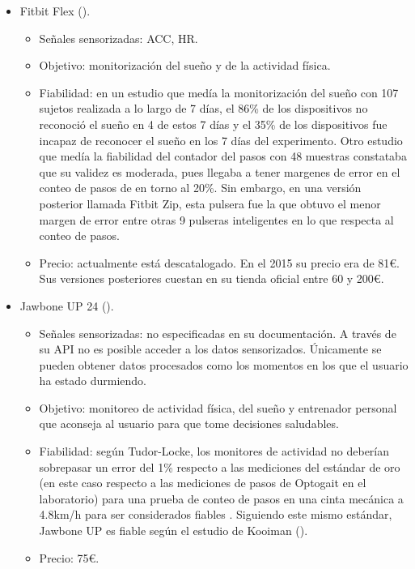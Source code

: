 \begin{itemize}
    \item Fitbit Flex (\citeyear{martinez2015wristband}).
    \begin{itemize}
        \item Señales sensorizadas: ACC, HR.
        \item Objetivo: monitorización del sueño y de la actividad física.
        \item Fiabilidad: en un estudio que medía la monitorización del sueño con 107 sujetos realizada a lo largo de 7 días, el 86\% de los dispositivos no reconoció el sueño en 4 de estos 7 días y el 35\% de los dispositivos fue incapaz de reconocer el sueño en los 7 días del experimento\citep{baroni2015fitbit}. Otro estudio que medía la fiabilidad del contador del pasos con 48 muestras constataba que su validez es moderada, pues llegaba a tener margenes de error en el conteo de pasos de en torno al 20\%\citep{sushames2016validity}. Sin embargo, en una versión posterior llamada Fitbit Zip, esta pulsera fue la que obtuvo el menor margen de error entre otras 9 pulseras inteligentes en lo que respecta al conteo de pasos\citep{kooiman2015reliability}.
        \item Precio: actualmente está descatalogado. En el 2015 su precio era de 81€. Sus versiones posteriores cuestan en su tienda oficial entre 60 y 200€.
    \end{itemize}

    \item Jawbone UP 24 (\citeyear{jawbone24}).
    \begin{itemize}
        \item Señales sensorizadas: no especificadas en su documentación. A través de su API no es posible acceder a los datos sensorizados. Únicamente se pueden obtener datos procesados como los momentos en los que el usuario ha estado durmiendo.
        \item Objetivo: monitoreo de actividad física, del sueño y entrenador personal que aconseja al usuario para que tome decisiones saludables.
        \item Fiabilidad: según Tudor-Locke, los monitores de actividad no deberían sobrepasar un error del 1\% respecto a las mediciones del estándar de oro (en este caso respecto a las mediciones de pasos de Optogait\citeyear{optogait} en el laboratorio) para una prueba de conteo de pasos en una cinta mecánica a 4.8km/h para ser considerados fiables \citep{tudor2011many}. Siguiendo este mismo estándar, Jawbone UP es fiable según el estudio de Kooiman (\citeyear{kooiman2015reliability}).
        \item Precio: 75€.
    \end{itemize}


\end{itemize}
